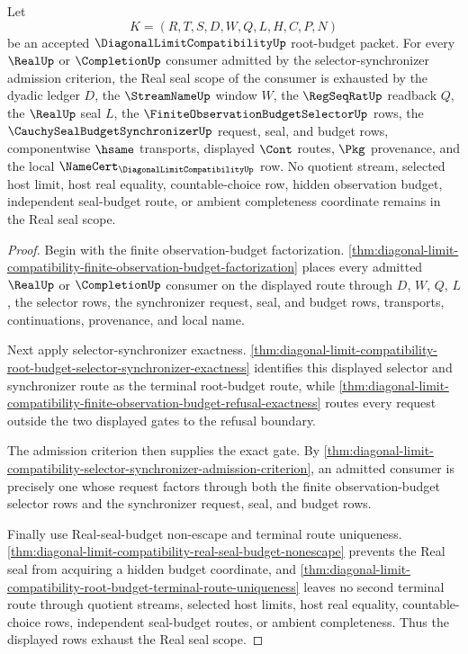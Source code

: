 \begin{theorem}
\label{thm:diagonal-limit-compatibility-selector-synchronizer-real-seal-scope}
Let
$$
K=(R,T,S,D,W,Q,L,H,C,P,N)
$$
be an accepted $\DiagonalLimitCompatibilityUp$ root-budget packet. For every $\RealUp$ or $\CompletionUp$ consumer admitted by the selector-synchronizer admission criterion, the Real seal scope of the consumer is exhausted by the dyadic ledger $D$, the $\StreamNameUp$ window $W$, the $\RegSeqRatUp$ readback $Q$, the $\RealUp$ seal $L$, the $\FiniteObservationBudgetSelectorUp$ rows, the $\CauchySealBudgetSynchronizerUp$ request, seal, and budget rows, componentwise $\hsame$ transports, displayed $\Cont$ routes, $\Pkg$ provenance, and the local $\NameCert_{\DiagonalLimitCompatibilityUp}$ row. No quotient stream, selected host limit, host real equality, countable-choice row, hidden observation budget, independent seal-budget route, or ambient completeness coordinate remains in the Real seal scope.
\end{theorem}
\begin{proof}
Begin with the finite observation-budget factorization. \autoref{thm:diagonal-limit-compatibility-finite-observation-budget-factorization} places every admitted $\RealUp$ or $\CompletionUp$ consumer on the displayed route through $D$, $W$, $Q$, $L$, the selector rows, the synchronizer request, seal, and budget rows, transports, continuations, provenance, and local name.

Next apply selector-synchronizer exactness. \autoref{thm:diagonal-limit-compatibility-root-budget-selector-synchronizer-exactness} identifies this displayed selector and synchronizer route as the terminal root-budget route, while \autoref{thm:diagonal-limit-compatibility-finite-observation-budget-refusal-exactness} routes every request outside the two displayed gates to the refusal boundary.

The admission criterion then supplies the exact gate. By \autoref{thm:diagonal-limit-compatibility-selector-synchronizer-admission-criterion}, an admitted consumer is precisely one whose request factors through both the finite observation-budget selector rows and the synchronizer request, seal, and budget rows.

Finally use Real-seal-budget non-escape and terminal route uniqueness. \autoref{thm:diagonal-limit-compatibility-real-seal-budget-nonescape} prevents the Real seal from acquiring a hidden budget coordinate, and \autoref{thm:diagonal-limit-compatibility-root-budget-terminal-route-uniqueness} leaves no second terminal route through quotient streams, selected host limits, host real equality, countable-choice rows, independent seal-budget routes, or ambient completeness. Thus the displayed rows exhaust the Real seal scope.
\end{proof}

